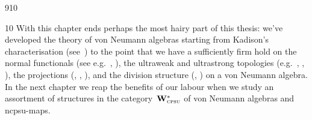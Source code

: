 \begin{parsec}{910}
\begin{point}{10}
With this chapter
ends perhaps the most hairy part of this thesis:
we've developed the theory of von Neumann algebras
starting from Kadison's characterisation (see~)
to the point that we have a sufficiently firm hold on the normal functionals
(see e.g.~, ),
the ultraweak and ultrastrong topologies 
(e.g.~, , 
	),
the projections (, , 
), 
and the division structure 
(, )
on a von Neumann algebra.
In the next chapter we reap the benefits of our labour
when we study an assortment of structures
in the category~$\mathbf{W}^*_{\text{\textsc{cpsu}}}$ of von Neumann algebras
and ncpsu-maps.
\end{point}
\end{parsec}

